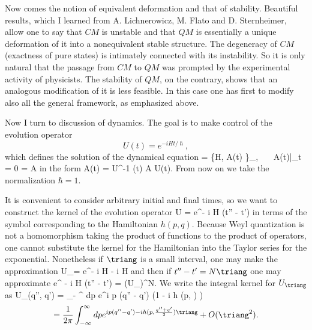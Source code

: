Now comes the notion of equivalent deformation and that of
stability.
Beautiful results, which I learned from A. Lichnerowicz, M.
Flato and D. Sternheimer, allow one to say that $CM$ is
unstable and that $QM$ is essentially a unique deformation
of it into a nonequivalent stable structure.
The degeneracy of $CM$ (exactness of pure states) is
intimately connected with its instability.
So it is only natural that the passage from $CM$ to $QM$ was
prompted by the experimental activity of physicists.
The stability of $QM$, on the contrary, shows that an
analogous modification of it is less feasible.
In this case one has first to modify also all the general
framework, as emphasized above.

Now I turn to discussion of dynamics.
The goal is to make control of the evolution operator
$$
U(t)=e^{-iHt/\hslash},
$$
which defines the solution of the 
dynamical equation 
\beq {} = \{H, A(t) \}_{\hbar}, ~~~A(t)|_{t = 0 } = A \eeq
in the form 
\beq A(t) = U^{-1} (t) A U(t). \eeq
{}From now on we take the normalization $\hbar = 1$. 















\nc{\bra}{  < }
\nc{\ket}{ > }
\nc{\triang}{ { \bigtriangleup} }


It is convenient to consider arbitrary initial and final times, so we
want to 
construct the kernel of the evolution operator 
\beq \label{1.09} U = e^{- i H (t'' - t')}  \eeq
in terms of the symbol corresponding to the Hamiltonian 
$h (p,q)$. Because Weyl quantization is not a homomorphism taking 
the product of functions to the product of operators, one cannot 
substitute the kernel for the Hamiltonian into the Taylor series for the 
exponential. Nonetheless if $\triang$ is a small interval, one may make the 
approximation
\beq \label{1.10} U_\triang = e^{- i H \triang}  - i H \triang \eeq
and then if $ t'' - t' = N \triang $ one may approximate 
\beq \label{1.11} e^{ - i H (t'' - t')} = (U_\triang)^N. \eeq
We write the integral kernel for $U_\triang$ as 
\beq \label{1.12} U_\triang (q'', q') =  \int_{- \infty}^\infty
dp e^{i p (q'' - q') } \Bigl (1 - i h (p, 
 ) \triang \Bigr  )  \eeq
$$ = \frac{1}{2 \pi} \int_{- \infty}^\infty dp  e^{i p (q'' - q')  - i 
 h (p, \frac{q'' + q'}{2}) \triang }  + O (\triang^2). $$

